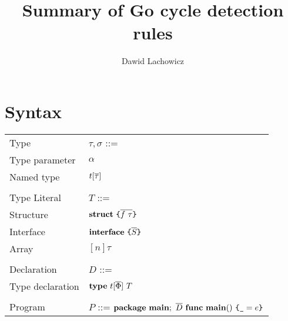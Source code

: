 \documentclass[12pt]{article}
\title{Summary of Go cycle detection rules}
\author{Dawid Lachowicz}
\begin{document}
\maketitle

\section{Syntax}

\begin{minipage}[t]{\textwidth}
    \begin{tabular}[t]{ll}
        Type                   & $\tau, \sigma$ ::=                                        \\
        \quad Type parameter   & \quad $\alpha$                                            \\
        \quad Named type       & \quad $t[\overline{\tau}]$                                      \\\\
        Type Literal           & $T$ ::=                                                   \\
        \quad Structure        & \quad $\texttt{\bf struct}~\texttt{\{}\overline{f~\tau}\texttt{\}}$                          \\
        \quad Interface        & \quad $\texttt{\bf interface}~\texttt{\{}\overline{S}\texttt{\}}$                            \\
        \quad Array            & \quad$[n]\tau$                                            \\
        \\
        Declaration            & $D$ ::=                                                   \\
        \quad Type declaration & \quad $\texttt{\bf type}~t[\overline{\Phi}]~T$                              \\
        \\
        Program                & $P$ ::= $\texttt{\bf package}~\texttt{\bf main};~\overline{D}~\texttt{\bf func}~\texttt{\bf main}()~\texttt{\{}\texttt{\textunderscore}=e\texttt{\}}$
    \end{tabular}
\end{minipage}
\hspace{-0.5\textwidth}
\end{document}
